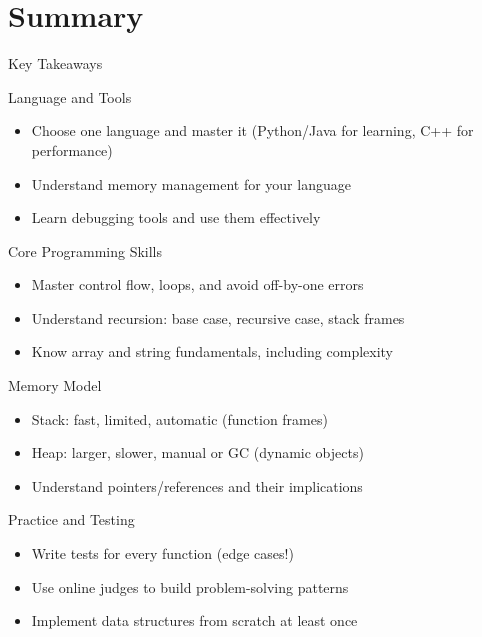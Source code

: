 \documentclass[aspectratio=169,xcolor=dvipsnames]{beamer}
\begin{document}
\section{Summary}

\begin{frame}{Key Takeaways}
  \begin{block}{Language and Tools}
    \begin{itemize}
      \item Choose one language and master it (Python/Java for learning, C++ for performance)
      \item Understand memory management for your language
      \item Learn debugging tools and use them effectively
    \end{itemize}
  \end{block}

  \begin{block}{Core Programming Skills}
    \begin{itemize}
      \item Master control flow, loops, and avoid off-by-one errors
      \item Understand recursion: base case, recursive case, stack frames
      \item Know array and string fundamentals, including complexity
    \end{itemize}
  \end{block}

  \begin{block}{Memory Model}
    \begin{itemize}
      \item Stack: fast, limited, automatic (function frames)
      \item Heap: larger, slower, manual or GC (dynamic objects)
      \item Understand pointers/references and their implications
    \end{itemize}
  \end{block}

  \begin{block}{Practice and Testing}
    \begin{itemize}
      \item Write tests for every function (edge cases!)
      \item Use online judges to build problem-solving patterns
      \item Implement data structures from scratch at least once
    \end{itemize}
  \end{block}
\end{frame}
\end{document}
